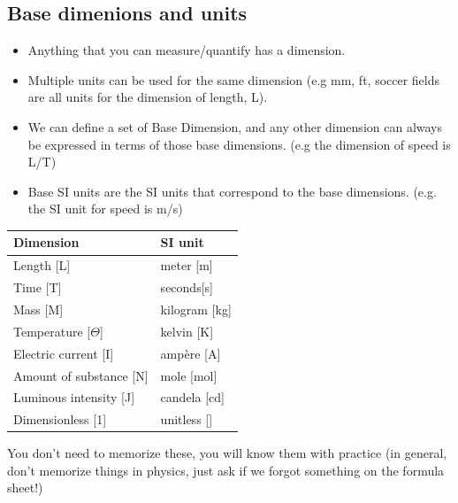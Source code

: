 \documentclass[aspectratio=169,
hyperref={colorlinks,urlcolor=blue}
]{beamer}
\begin{document}
\subsection{Base dimenions and units}
\label{subsec:basedimensionsandunits}
{
\begin{itemize}
\item Anything that you can measure/quantify has a dimension.
\item Multiple units can be used for the same dimension (e.g mm, ft, soccer fields are all units for the dimension of length, L).
\item We can define a set of Base Dimension, and any other dimension can always be expressed in terms of those base dimensions. (e.g the dimension of speed is L/T)
\item Base SI units are the SI units that correspond to the base dimensions. (e.g. the SI unit for speed is m/s)
\end{itemize}
}
{
\scriptsize
\begin{center}
\begin{tabular}{ll }
\textbf{Dimension}&\textbf{SI unit}\\
\hline
\hline
Length [L]& meter [m]\\ \hline
Time [T]& seconds[s] \\ \hline
Mass [M]& kilogram [kg]\\ \hline
Temperature [$\Theta$]& kelvin [K] \\ \hline
Electric current [I]& amp\`ere [A]\\ \hline
Amount of substance [N]& mole [mol] \\ \hline
Luminous intensity [J]& candela [cd] \\ \hline
Dimensionless [1]& unitless [] \\ \hline
\end{tabular}
\end{center}
You don’t need to memorize these, you will know them with practice (in general, don’t memorize things in physics, just ask if we forgot something on the formula sheet!)
}


\end{document}
